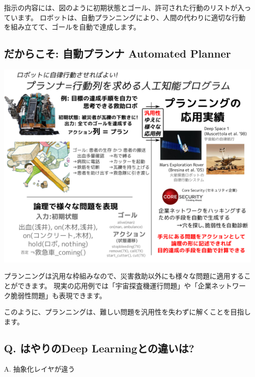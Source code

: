 \begin{resume}
指示の内容には、図のように初期状態とゴール、許可された行動のリストが入っています。
ロボットは、自動プランニングにより、人間の代わりに適切な行動を組み立てて、ゴールを自動で達成します。
\end{resume}

\subsection{だからこそ: 自動プランナ Automated Planner}
\label{sec-4-5}

\includegraphics{img/planning/final.png}

\begin{resume}
プランニングは汎用な枠組みなので、災害救助以外にも様々な問題に適用することができます。
現実の応用例では「宇宙探査機運行問題」や「企業ネットワーク脆弱性問題」も表現できます。

このように、プランニングは、難しい問題を汎用性を失わずに解くことを目指します。
\end{resume}

\subsection{Q. はやりのDeep Learningとの違いは?}
\label{sec-4-6}

A. 抽象化レイヤが違う

